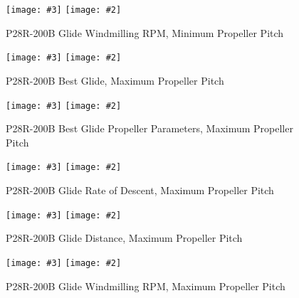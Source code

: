 \documentclass[a4paper,10pt,pdftex]{article}
\newcommand{\jnxfig}[3][]{\ifmypdf\texttt{[image: \#3]}
  \else\texttt{[image: \#2]}\fi}
\begin{document}
\begin{figure}[!htbp]
  \begin{center}
    \jnxfig[angle=0,width=\linewidth]{p28rgliderpmpp14.eps}{p28rgliderpmpp14.pdf}
    \caption{P28R-200B Glide Windmilling RPM, Minimum Propeller Pitch}
    \label{fig:p28rgliderpmpp14}
  \end{center}
\end{figure}

\begin{figure}[!htbp]
  \begin{center}
    \jnxfig[angle=0,width=\linewidth]{p28rbestglidepp29.eps}{p28rbestglidepp29.pdf}
    \caption{P28R-200B Best Glide, Maximum Propeller Pitch}
    \label{fig:p28rbestglidepp29}
  \end{center}
\end{figure}

\begin{figure}[!htbp]
  \begin{center}
    \jnxfig[angle=0,width=\linewidth]{p28rbestglideproppp29.eps}{p28rbestglideproppp29.pdf}
    \caption{P28R-200B Best Glide Propeller Parameters, Maximum Propeller Pitch}
    \label{fig:p28rbestglideproppp29}
  \end{center}
\end{figure}

\begin{figure}[!htbp]
  \begin{center}
    \jnxfig[angle=0,width=\linewidth]{p28rgliderodpp29.eps}{p28rgliderodpp29.pdf}
    \caption{P28R-200B Glide Rate of Descent, Maximum Propeller Pitch}
    \label{fig:p28rgliderodpp29}
  \end{center}
\end{figure}

\begin{figure}[!htbp]
  \begin{center}
    \jnxfig[angle=0,width=\linewidth]{p28rglidedistpp29.eps}{p28rglidedistpp29.pdf}
    \caption{P28R-200B Glide Distance, Maximum Propeller Pitch}
    \label{fig:p28rglidedistpp29}
  \end{center}
\end{figure}

\begin{figure}[!htbp]
  \begin{center}
    \jnxfig[angle=0,width=\linewidth]{p28rgliderpmpp29.eps}{p28rgliderpmpp29.pdf}
    \caption{P28R-200B Glide Windmilling RPM, Maximum Propeller Pitch}
    \label{fig:p28rgliderpmpp29}
  \end{center}
\end{figure}
\clearpage
\end{document}
